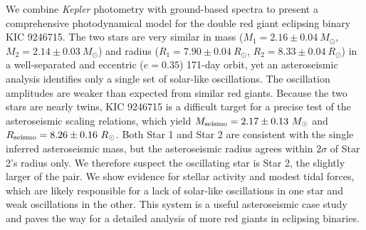We combine \emph{Kepler} photometry with ground-based spectra to present a comprehensive photodynamical model for the double red giant eclipsing binary KIC 9246715. The two stars are very similar in mass ($M_1 = 2.16 \pm 0.04\ M_{\odot}$, $M_2 = 2.14 \pm 0.03\ M_{\odot}$) and radius ($R_1 = 7.90 \pm 0.04 \ R_{\odot}$, $R_2 = 8.33 \pm 0.04 \ R_{\odot}$) in a well-separated and eccentric ($e = 0.35$) 171-day orbit, yet an asteroseismic analysis identifies only a single set of solar-like oscillations. The oscillation amplitudes are weaker than expected from similar red giants. Because the two stars are nearly twins, KIC 9246715 is a difficult target for a precise test of the asteroseismic scaling relations, which yield $M_{\rm{seismo}} = 2.17 \pm 0.13 \ M_{\odot}$ and $R_{\rm{seismo}} = 8.26 \pm 0.16 \ R_{\odot}$. Both Star 1 and Star 2 are consistent with the single inferred asteroseismic mass, but the asteroseismic radius agrees within $2 \sigma$ of Star 2's radius only. We therefore suspect the oscillating star is Star 2, the slightly larger of the pair. We show evidence for stellar activity and modest tidal forces, which are likely responsible for a lack of solar-like oscillations in one star and weak oscillations in the other. This system is a useful asteroseismic case study and paves the way for a detailed analysis of more red giants in eclipsing binaries.
    
    
  
  
  